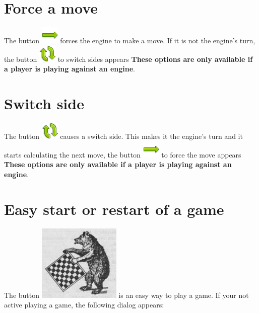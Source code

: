 \documentclass[11pt,a4paper]{article}
\begin{document}
\section{Force a move} \label{forceMove}

The button \includegraphics[scale=0.4]{arrow_right.png} forces the engine to make a move. If it is not the engine's turn, the button \includegraphics[scale=0.4]{arrow_refresh.png} to switch sides appears \textbf{These options are only available if a player is playing against an engine}.

\section{Switch side} \label{switchSide}

The button \includegraphics[scale=0.4]{arrow_refresh.png} causes a  switch side. This makes it the engine's turn and it starts calculating the next move, the button \includegraphics[scale=0.4]{arrow_right.png} to force the move appears \textbf{These options are only available if a player is playing against an engine}.

\section{Easy start or restart of a game} \label{easyStart}

The button \includegraphics[scale=0.2]{bearchess_2.png} is an easy way to play a game. If your not active playing a game, the following dialog appears:
\end{document}
